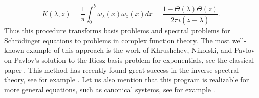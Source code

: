 \documentclass{article}[12pt]
\theoremstyle{remark}
\begin{document}
\begin{equation*}
    K(\lambda,z) = \frac{1}{\pi}\int_{0}^{b} \omega_{\overline{\lambda}}(x)\omega_{z}(x)dx = \frac{1-\overline{\Theta(\lambda)}\Theta(z)}{2\pi i(z-\overline{\lambda})}.
\end{equation*}
Thus this procedure transforms basis problems and spectral problems for Schrödinger equations to problems in complex function theory. The most well-known example of this approach is the work of Khrushchev, Nikolski, and Pavlov on Pavlov's solution to the Riesz basis problem for exponentials, see the classical paper \cite{MR643384}. This method has recently found great success in the inverse spectral theory, see for example \cite{MR2739783, MR1943095, MR4033521}. Let us also mention that this program is realizable for more general equations, such as canonical systems, see for example \cite{MR4639943, aleman2025invariantsubspacesgeneralizeddifferentiation, MR3890099}.\newline
\end{document}
